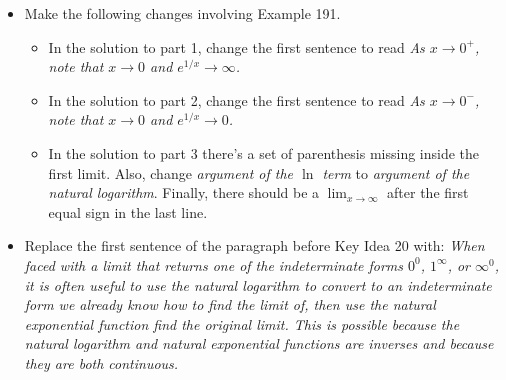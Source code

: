 \documentclass[12pt]{report}
\begin{document}
\begin{itemize}

\item Make the following changes involving Example 191.
\begin{itemize}
\item In the solution to part 1, change the first sentence to read \emph{As $x\to 0^+$, note that $x\to 0$ and $e^{1/x}\to \infty$.}

\item In the solution to part 2, change the first sentence to read \emph{As $x\to 0^-$, note that $x\to 0$ and $e^{1/x}\to 0$.}

\item In the solution to part 3 there's a set of parenthesis missing inside the first limit. Also, change \emph{argument of the $\ln$ term} to \emph{argument of the natural logarithm}. Finally, there should be a $\lim_{x\to\infty}$ after the first equal sign in the last line.
\end{itemize}

\item Replace the first sentence of the paragraph before Key Idea 20 with: \emph{When faced with a limit that returns one of the indeterminate forms $0^0$, $1^\infty$, or $\infty^0$, it  is often useful to use the natural logarithm to convert to an indeterminate form we already know how to find the limit of, then use the natural exponential function find the original limit. This is possible because the natural logarithm and natural exponential functions are inverses and because they are both continuous.}


\end{itemize}
\end{document}
